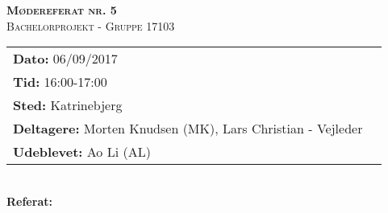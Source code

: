 
\newcommand{\HRule}{\rule{\linewidth}{0.1mm}}


	\begin{center}
		{\huge \bfseries \textsc{Mødereferat nr. 5}}\\
		\textsc{\large Bachelorprojekt - Gruppe 17103}\\[0.3cm]
	\end{center}
	\begin{tabular}{ll}
	\large \textbf{Dato:} 06/09/2017  	\\ %
	\large \textbf{Tid:}  16:00-17:00 	\\ %
	\large \textbf{Sted:} Katrinebjerg		\\ %
	\large \textbf{Deltagere:} Morten Knudsen (MK), Lars Christian - Vejleder \\
	\large \textbf{Udeblevet:} Ao Li (AL)
	\end{tabular}\\
	\phantom{\,}\hspace{0.1em} \large \textbf{Referat:}

